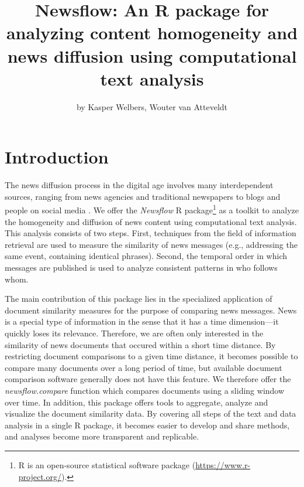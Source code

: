 \title{Newsflow: An R package for analyzing content homogeneity and news
diffusion using computational text analysis}
\author{by Kasper Welbers, Wouter van Atteveldt}

\maketitle


\section{Introduction}

The news diffusion process in the digital age involves many
interdependent sources, ranging from news agencies and traditional
newspapers to blogs and people on social media
\citep{meraz11, paterson05, pew10}. We offer the \emph{Newsflow} R
package\footnote{R is an open-source statistical software package
  (\url{https://www.r-project.org/}).} as a toolkit to analyze the
homogeneity and diffusion of news content using computational text
analysis. This analysis consists of two steps. First, techniques from
the field of information retrieval are used to measure the similarity of
news messages (e.g., addressing the same event, containing identical
phrases). Second, the temporal order in which messages are published is
used to analyze consistent patterns in who follows whom.

The main contribution of this package lies in the specialized
application of document similarity measures for the purpose of comparing
news messages. News is a special type of information in the sense that
it has a time dimension---it quickly loses its relevance. Therefore, we
are often only interested in the similarity of news documents that
occured within a short time distance. By restricting document
comparisons to a given time distance, it becomes possible to compare
many documents over a long period of time, but available document
comparison software generally does not have this feature. We therefore
offer the \emph{newsflow.compare} function which compares documents
using a sliding window over time. In addition, this package offers tools
to aggregate, analyze and visualize the document similarity data. By
covering all steps of the text and data analysis in a single R package,
it becomes easier to develop and share methods, and analyses become more
transparent and replicable.

